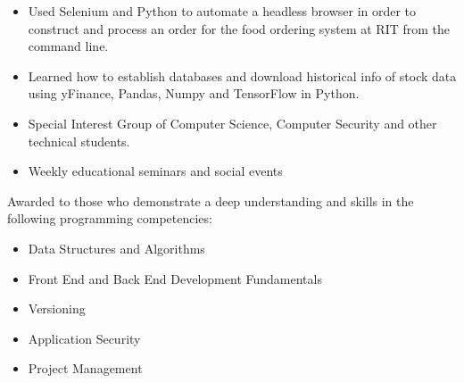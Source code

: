 \documentclass[10pt,a4paper,ragged2e,withhyper]{altacv}
\begin{document}
\begin{paracol}{2}
\begin{itemize}
\item  Used Selenium and Python to automate a headless browser in order to construct and process an order for the food ordering system at RIT from the command line. 
\smallskip \smallskip
\end{itemize}
    \newline
       
    \newline
    \divider
    
    
\begin{itemize}
\item Learned how to establish databases and download historical info of stock data using yFinance, Pandas, Numpy and TensorFlow in Python. 
\end{itemize}
\smallskip \smallskip
    \newline
       
    \newline
    
    \switchcolumn
    \bigskip
    \bigskip

    \smallskip 
    
\begin{itemize}
\item Special Interest Group of Computer Science, Computer Security and other technical students. 
\item Weekly educational seminars and social events
\end{itemize}

   
    \smallskip 
    
Awarded to those who demonstrate a deep understanding and skills in the following programming competencies: 
\begin{itemize}
\item Data Structures and Algorithms 
\item Front End and Back End Development Fundamentals
\item Versioning
\item Application Security
\item Project Management
\end{itemize}







   
    \end{paracol}
    
 
    
    
    
\end{document}
